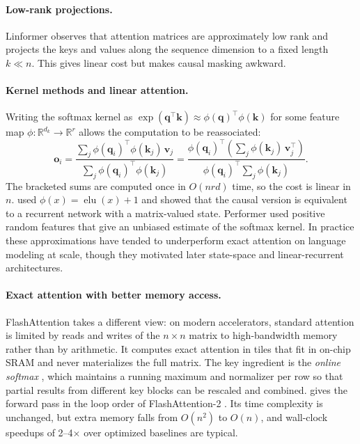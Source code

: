 \documentclass[11pt]{article}
\newcommand{\R}{\mathbb{R}}
\begin{document}
\paragraph{Low-rank projections.} Linformer \citep{wang2020linformer} observes that attention matrices are approximately low rank and projects the keys and values along the sequence dimension to a fixed length $k \ll n$. This gives linear cost but makes causal masking awkward.

\paragraph{Kernel methods and linear attention.} Writing the softmax kernel as $\exp(\bm{q}^\top\bm{k}) \approx \phi(\bm{q})^\top\phi(\bm{k})$ for some feature map $\phi\colon \R^{d_k} \to \R^{r}$ allows the computation to be reassociated:
\begin{equation}
  \bm{o}_i = \frac{\sum_j \phi(\bm{q}_i)^\top \phi(\bm{k}_j)\, \bm{v}_j}{\sum_j \phi(\bm{q}_i)^\top \phi(\bm{k}_j)}
  = \frac{\phi(\bm{q}_i)^\top \left( \sum_j \phi(\bm{k}_j)\, \bm{v}_j^\top \right)}{\phi(\bm{q}_i)^\top \sum_j \phi(\bm{k}_j)}.
  \label{eq:linear-attn}
\end{equation}
The bracketed sums are computed once in $O(n r d)$ time, so the cost is linear in $n$. \citet{katharopoulos2020transformers} used $\phi(x) = \operatorname{elu}(x) + 1$ and showed that the causal version is equivalent to a recurrent network with a matrix-valued state. Performer \citep{choromanski2021rethinking} used positive random features that give an unbiased estimate of the softmax kernel. In practice these approximations have tended to underperform exact attention on language modeling at scale, though they motivated later state-space and linear-recurrent architectures.

\paragraph{Exact attention with better memory access.} FlashAttention \citep{dao2022flashattention} takes a different view: on modern accelerators, standard attention is limited by reads and writes of the $n \times n$ matrix to high-bandwidth memory rather than by arithmetic. It computes exact attention in tiles that fit in on-chip SRAM and never materializes the full matrix. The key ingredient is the \emph{online softmax} \citep{milakov2018online}, which maintains a running maximum and normalizer per row so that partial results from different key blocks can be rescaled and combined.  gives the forward pass in the loop order of FlashAttention-2 \citep{dao2024flashattention2}. Its time complexity is unchanged, but extra memory falls from $O(n^2)$ to $O(n)$, and wall-clock speedups of 2--4$\times$ over optimized baselines are typical.
\end{document}
